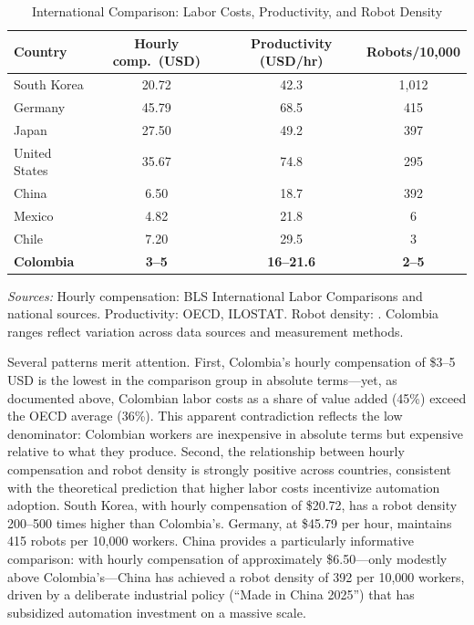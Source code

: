 \begin{table}[H]
\centering
\caption{International Comparison: Labor Costs, Productivity, and Robot Density}
\label{tab:international_comparison}
\begin{threeparttable}
\begin{tabular}{lccc}
\toprule
\textbf{Country} & \textbf{Hourly comp.\ (USD)} & \textbf{Productivity (USD/hr)} & \textbf{Robots/10,000} \\
\midrule
South Korea & 20.72 & 42.3 & 1,012 \\
Germany & 45.79 & 68.5 & 415 \\
Japan & 27.50 & 49.2 & 397 \\
United States & 35.67 & 74.8 & 295 \\
China & 6.50 & 18.7 & 392 \\
Mexico & 4.82 & 21.8 & 6 \\
Chile & 7.20 & 29.5 & 3 \\
\textbf{Colombia} & \textbf{3--5} & \textbf{16--21.6} & \textbf{2--5} \\
\bottomrule
\end{tabular}
\begin{tablenotes}
\small
\item \textit{Sources:} Hourly compensation: BLS International Labor Comparisons and national sources. Productivity: OECD, ILOSTAT. Robot density: \cite{ifr2024}. Colombia ranges reflect variation across data sources and measurement methods.
\end{tablenotes}
\end{threeparttable}
\end{table}

Several patterns merit attention. First, Colombia's hourly compensation of \$3--5 USD is the lowest in the comparison group in absolute terms---yet, as documented above, Colombian labor costs as a share of value added (45\%) exceed the OECD average (36\%). This apparent contradiction reflects the low denominator: Colombian workers are inexpensive in absolute terms but expensive relative to what they produce. Second, the relationship between hourly compensation and robot density is strongly positive across countries, consistent with the theoretical prediction that higher labor costs incentivize automation adoption. South Korea, with hourly compensation of \$20.72, has a robot density 200--500 times higher than Colombia's. Germany, at \$45.79 per hour, maintains 415 robots per 10,000 workers. China provides a particularly informative comparison: with hourly compensation of approximately \$6.50---only modestly above Colombia's---China has achieved a robot density of 392 per 10,000 workers, driven by a deliberate industrial policy (``Made in China 2025'') that has subsidized automation investment on a massive scale.

